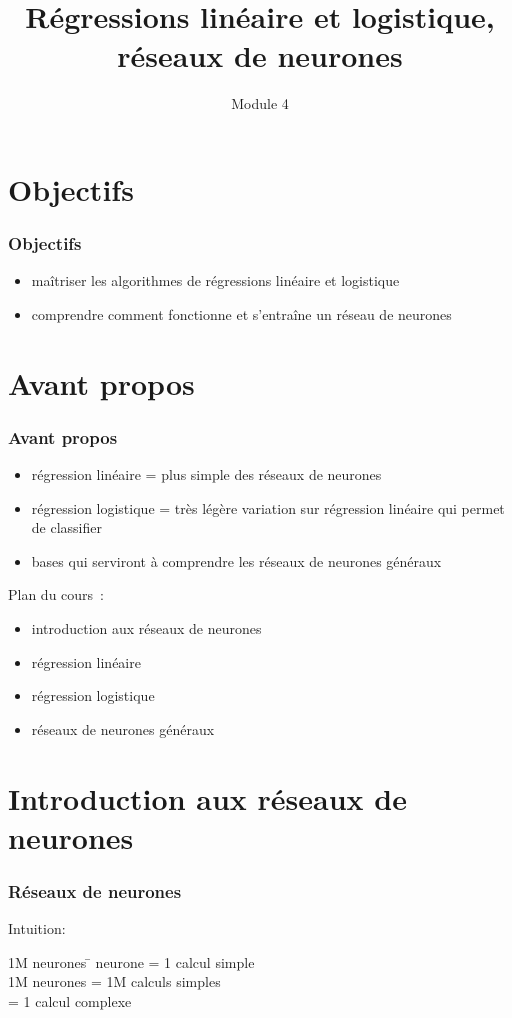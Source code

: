 \documentclass{formation}
\title{Régressions linéaire et logistique, réseaux de neurones}
\subtitle{Module 4}
\begin{document}
\maketitle

\section{Objectifs}
\begin{frame}
  \frametitle{Objectifs}
  \begin{itemize}
  \item maîtriser les algorithmes de régressions linéaire et
    logistique
  \item comprendre comment fonctionne et s'entraîne un réseau de
    neurones
  \end{itemize}
\end{frame}

\section{Avant propos}

\begin{frame}
  \frametitle{Avant propos}

  \begin{itemize}
  \item régression linéaire = plus simple des réseaux de neurones
  \item régression logistique = très légère variation sur régression
    linéaire qui permet de classifier
  \item bases qui serviront à comprendre les réseaux de neurones
    généraux
  \end{itemize}

  Plan du cours :
  \begin{itemize}
  \item introduction aux réseaux de neurones
  \item régression linéaire
  \item régression logistique
  \item réseaux de neurones généraux
  \end{itemize}
\end{frame}

\section{Introduction aux réseaux de neurones}

\begin{frame}
  \frametitle{Réseaux de neurones}
  Intuition:
  \begin{tabbing}
    1M neurones \= neurone \>= 1 calcul simple\\
    1M neurones \>= 1M calculs simples\\
    \>= 1 calcul complexe\\
  \end{tabbing}
\end{frame}
\end{document}
